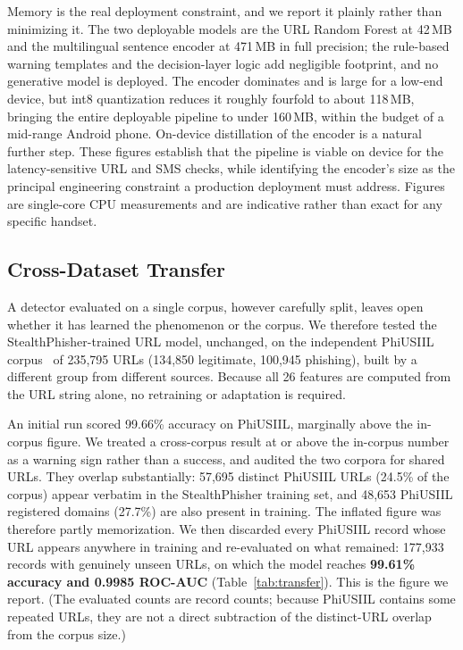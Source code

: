 \documentclass[manuscript,screen,review]{acmart}
\begin{document}
Memory is the real deployment constraint, and we report it plainly rather than minimizing it. The two deployable models are the URL Random Forest at 42\,MB and the multilingual sentence encoder at 471\,MB in full precision; the rule-based warning templates and the decision-layer logic add negligible footprint, and no generative model is deployed. The encoder dominates and is large for a low-end device, but int8 quantization reduces it roughly fourfold to about 118\,MB, bringing the entire deployable pipeline to under 160\,MB, within the budget of a mid-range Android phone. On-device distillation of the encoder is a natural further step. These figures establish that the pipeline is viable on device for the latency-sensitive URL and SMS checks, while identifying the encoder's size as the principal engineering constraint a production deployment must address. Figures are single-core CPU measurements and are indicative rather than exact for any specific handset.

\subsection{Cross-Dataset Transfer}
A detector evaluated on a single corpus, however carefully split, leaves open whether it has learned the phenomenon or the corpus. We therefore tested the StealthPhisher-trained URL model, unchanged, on the independent PhiUSIIL corpus~\cite{phiusiil} of 235{,}795 URLs (134{,}850 legitimate, 100{,}945 phishing), built by a different group from different sources. Because all 26 features are computed from the URL string alone, no retraining or adaptation is required.

An initial run scored 99.66\% accuracy on PhiUSIIL, marginally above the in-corpus figure. We treated a cross-corpus result at or above the in-corpus number as a warning sign rather than a success, and audited the two corpora for shared URLs. They overlap substantially: 57{,}695 distinct PhiUSIIL URLs (24.5\% of the corpus) appear verbatim in the StealthPhisher training set, and 48{,}653 PhiUSIIL registered domains (27.7\%) are also present in training. The inflated figure was therefore partly memorization. We then discarded every PhiUSIIL record whose URL appears anywhere in training and re-evaluated on what remained: 177{,}933 records with genuinely unseen URLs, on which the model reaches \textbf{99.61\% accuracy and 0.9985 ROC-AUC} (Table~\ref{tab:transfer}). This is the figure we report. (The evaluated counts are record counts; because PhiUSIIL contains some repeated URLs, they are not a direct subtraction of the distinct-URL overlap from the corpus size.)
\end{document}
